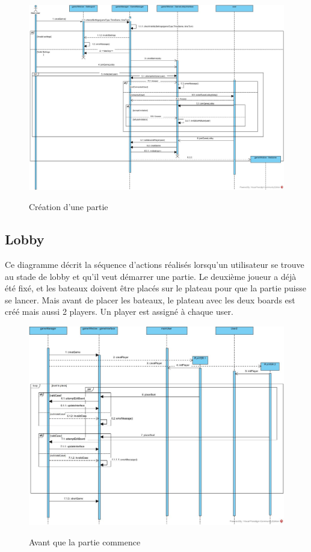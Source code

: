 \documentclass[../design_fonctionnement_sys.tex]{subfiles}
\begin{document}
\begin{figure}[H]
    \centering
    \includegraphics[scale=0.3]{img_design/PreLoby.jpg}
    \label{fig:seq_match_client}
    \caption{Création d'une partie}
\end{figure}

\newpage

\subsection{Lobby}
Ce diagramme décrit la séquence d'actions réalisés lorsqu'un utilisateur se trouve au stade de lobby et qu'il veut démarrer une partie.
Le deuxième joueur a déjà été fixé, et les bateaux doivent être placés sur le plateau pour que la partie puisse se lancer.
Mais avant de placer les bateaux, le plateau avec les deux boards est créé mais aussi 2 players. Un player est assigné à chaque user.

\begin{figure}[H]
    \centering
    \includegraphics[scale=0.4]{img_design/PreGame.jpg}
    \label{fig:seq_match_server}
    \caption{Avant que la partie commence}
\end{figure}
\newpage
\end{document}
